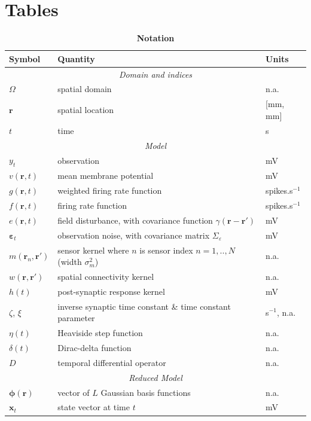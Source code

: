 \documentclass[12pt]{iopart}
\begin{document}
\section*{Tables}

\begin{table}[!ht]
\caption{
\bf{Notation}}
\begin{tabular}{|l|l|l|}
	\hline
	\textbf{Symbol} & \textbf{Quantity} & \textbf{Units}\\
	\hline
	\multicolumn{3}{|c|}{\emph{Domain and indices}}\\
	\hline
	$\Omega$ & spatial domain & n.a.\\
	$\mathbf{r}$ & spatial location & [mm, mm]\\
	$t$ & time & s\\
	\hline
	\multicolumn{3}{|c|}{\emph{Model}}\\
	\hline
    $y_t$ & observation & mV\\
    $v(\mathbf{r},t)$ & mean membrane potential & mV \\
	$g(\mathbf{r},t)$ & weighted firing rate function & spikes.s$^{-1}$\\
	$f(\mathbf{r},t)$ & firing rate function & spikes.s$^{-1}$\\
	$e(\mathbf{r},t)$ & field disturbance, with covariance function $\gamma(\mathbf r-\mathbf r')$ & mV\\
	$\boldsymbol\varepsilon_t$ & observation noise, with covariance matrix $\Sigma_\varepsilon$ & mV\\
	$m(\mathbf{r}_n,\mathbf{r}')$ & sensor kernel where $n$ is sensor index $n=1,..,N$ (width $\sigma_m^2$) & n.a. \\
	$w(\mathbf{r},\mathbf{r}')$ & spatial connectivity kernel & n.a.\\
	$h(t)$ & post-synaptic response kernel & mV\\
	$\zeta$, $\xi$ & inverse synaptic time constant \& time constant parameter & s$^{-1}$, n.a.\\
	$\eta(t)$ & Heaviside step function & n.a.\\
	$\delta(t)$ & Dirac-delta function & n.a.\\
	$D$ & temporal differential operator & n.a.\\
	\hline
	\multicolumn{3}{|c|}{\emph{Reduced Model}} \\
	\hline
   	$\boldsymbol\phi(\mathbf{r})$ & vector of $L$ Gaussian basis functions & n.a.\\
   	$\mathbf{x}_t$ & state vector at time $t$ & mV\\

\end{tabular}
\end{table}
\end{document}
